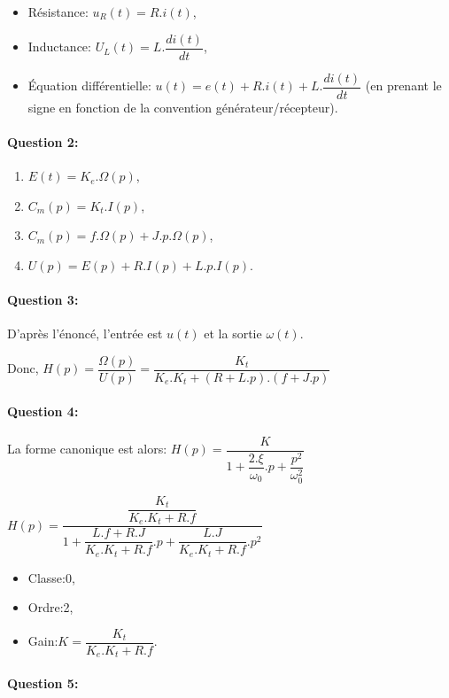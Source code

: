\begin{itemize}
 \item Résistance: $u_R(t)=R.i(t)$,
 \item Inductance: $U_L(t)=L.\dfrac{di(t)}{dt}$,
 \item Équation différentielle: $u(t)=e(t)+R.i(t)+L.\dfrac{di(t)}{dt}$ (en prenant le signe en fonction de la convention générateur/récepteur).
\end{itemize}

\paragraph{Question 2:}

\begin{enumerate}
 \item $E(t)=K_e.\Omega(p)$,
 \item $C_m(p)=K_t.I(p)$,
 \item $C_m(p)=f.\Omega(p)+J.p.\Omega(p)$,
 \item $U(p)=E(p)+R.I(p)+L.p.I(p)$.
\end{enumerate}

\paragraph{Question 3:}

D'après l'énoncé, l'entrée est $u(t)$ et la sortie $\omega(t)$.

Donc, $H(p)=\dfrac{\Omega(p)}{U(p)}=\dfrac{K_t}{K_e.K_t+(R+L.p).(f+J.p)}$

\paragraph{Question 4:}

La forme canonique est alors: $H(p)=\dfrac{K}{1+\dfrac{2.\xi}{\omega_0}.p+\dfrac{p^2}{\omega_0^2}}$

$H(p)=\dfrac{\dfrac{K_t}{K_e.K_t+R.f}}{1+\dfrac{L.f+R.J}{K_e.K_t+R.f}.p+\dfrac{L.J}{K_e.K_t+R.f}.p^2}$

\begin{itemize}
 \item Classe:0,
 \item Ordre:2,
 \item Gain:$K=\dfrac{K_t}{K_e.K_t+R.f}$.
\end{itemize}

\paragraph{Question 5:}

